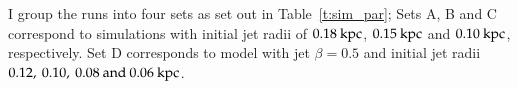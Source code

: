 

I group the runs into four sets as set out in Table~\ref{t:sim_par}; Sets A, B and C correspond to simulations with initial jet radii of $0.18  \> \rm kpc$, $0.15 \> \rm kpc$ and $0.10 \> \rm kpc$, respectively. Set D corresponds to model with jet $\beta = 0.5$ and initial jet radii $0.12, \> 0.10, \> 0.08 \> \rm and \> 0.06 \> kpc$.   

%
%

